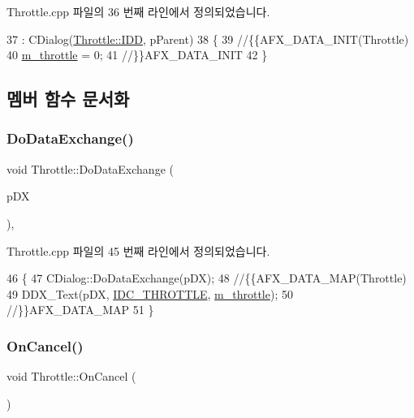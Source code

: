 Throttle.\+cpp 파일의 36 번째 라인에서 정의되었습니다.


\begin{DoxyCode}
37   : CDialog(\mbox{\hyperlink{class_throttle_abdcbc5b42292d645e94509c3735773a0af868d2e986217a461e4c8a6d70dabbb3}{Throttle::IDD}}, pParent)
38 \{
39   \textcolor{comment}{//\{\{AFX\_DATA\_INIT(Throttle)}
40   \mbox{\hyperlink{class_throttle_aba71c48b95cd2a114625ebb3db55bc0b}{m\_throttle}} = 0;
41   \textcolor{comment}{//\}\}AFX\_DATA\_INIT}
42 \}
\end{DoxyCode}


\subsection{멤버 함수 문서화}
\mbox{\label{class_throttle_a634843a66c6f1f27b70d8313a88765a5}} 
\subsubsection{\texorpdfstring{Do\+Data\+Exchange()}{DoDataExchange()}}
{\footnotesize\ttfamily void Throttle\+::\+Do\+Data\+Exchange (\begin{DoxyParamCaption}\item[{C\+Data\+Exchange $\ast$}]{p\+DX }\end{DoxyParamCaption})\hspace{0.3cm}{\ttfamily [protected]}, {\ttfamily [virtual]}}



Throttle.\+cpp 파일의 45 번째 라인에서 정의되었습니다.


\begin{DoxyCode}
46 \{
47   CDialog::DoDataExchange(pDX);
48   \textcolor{comment}{//\{\{AFX\_DATA\_MAP(Throttle)}
49   DDX\_Text(pDX, \mbox{\hyperlink{resource_8h_a56fe47d89724d47f1bcb9147f82c8246}{IDC\_THROTTLE}}, \mbox{\hyperlink{class_throttle_aba71c48b95cd2a114625ebb3db55bc0b}{m\_throttle}});
50   \textcolor{comment}{//\}\}AFX\_DATA\_MAP}
51 \}
\end{DoxyCode}
\mbox{\label{class_throttle_a958ff983d0c33bebd3a4035695774eed}} 
\subsubsection{\texorpdfstring{On\+Cancel()}{OnCancel()}}
{\footnotesize\ttfamily void Throttle\+::\+On\+Cancel (\begin{DoxyParamCaption}{ }\end{DoxyParamCaption})\hspace{0.3cm}{\ttfamily [protected]}}



